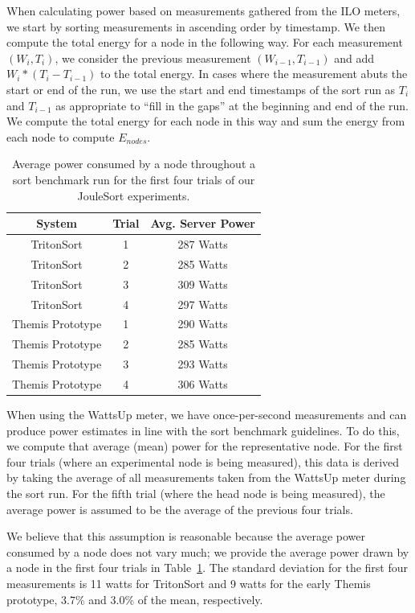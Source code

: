 When calculating power based on measurements gathered from the ILO meters, we
start by sorting measurements in ascending order by timestamp. We then compute
the total energy for a node in the following way. For each measurement $(W_i,
T_i)$, we consider the previous measurement $(W_{i-1}, T_{i-1})$ and add $W_i *
(T_i - T_{i-1})$ to the total energy. In cases where the measurement abuts the
start or end of the run, we use the start and end timestamps of the sort run as
$T_i$ and $T_{i - 1}$ as appropriate to ``fill in the gaps'' at the beginning
and end of the run. We compute the total energy for each node in this way and
sum the energy from each node to compute $E_{nodes}$.

\begin{table}
\centering
\caption{\label{table:power_draw} Average power consumed by a node throughout
a sort benchmark run for the first four trials of our JouleSort experiments.}
\begin{tabular}{|cc|c|}
\hline
\textbf{System} & \textbf{Trial} & \textbf{Avg. Server Power} \\
\hline
TritonSort & 1 & 287 Watts \\
TritonSort & 2 & 285 Watts \\
TritonSort & 3 & 309 Watts \\
TritonSort & 4 & 297 Watts \\
Themis Prototype & 1 & 290 Watts \\
Themis Prototype & 2 & 285 Watts \\
Themis Prototype & 3 & 293 Watts \\
Themis Prototype & 4 & 306 Watts \\
\hline
\end{tabular}
\end{table}

When using the WattsUp meter, we have once-per-second measurements and can
produce power estimates in line with the sort benchmark guidelines. To do this,
we compute that average (mean) power for the representative node. For the first
four trials (where an experimental node is being measured), this data is
derived by taking the average of all measurements taken from the WattsUp meter
during the sort run. For the fifth trial (where the head node is being
measured), the average power is assumed to be the average of the previous four
trials.

We believe that this assumption is reasonable because the average power
consumed by a node does not vary much; we provide the average power drawn by a
node in the first four trials in Table~\ref{table:power_draw}. The standard
deviation for the first four measurements is 11 watts for TritonSort and 9 watts
for the early Themis prototype, 3.7\% and 3.0\% of the mean, respectively.

